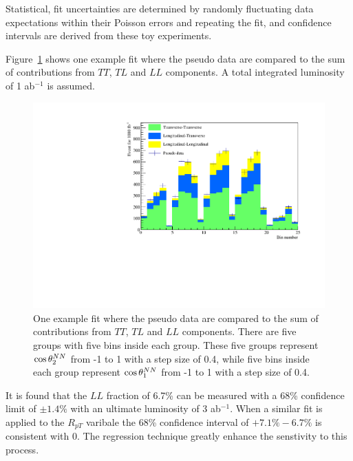 Statistical, fit uncertainties are determined by randomly
fluctuating data expectations within their Poisson errors and
repeating the fit, and confidence intervals are derived from these toy experiments.  


Figure~\ref{fig:fit_example} shows one example fit where the pseudo data are compared to the sum of 
contributions from $TT$, $TL$ and $LL$ components. A total integrated luminosity of 1 ab$^{-1}$ is assumed.  

\begin{figure}[h]
\includegraphics[width=.49\textwidth]{./fig/NN_fit_3.pdf}
\caption{\label{fig:fit_example} One example fit where the pseudo data are compared to the sum of 
contributions from $TT$, $TL$ and $LL$ components. There are five groups with five bins inside each group. 
These five groups represent $ \cos \theta^{NN}  _2$ from -1 to 1 with a step size of 0.4, while five bins inside each group represent $ \cos \theta^{NN}  _1$ from -1 to 1 with a step size of 0.4.}
\end{figure}

It is found that the $LL$ fraction of 6.7\% can be measured with a 68\% confidence limit of $\pm1.4\%$ with an ultimate luminosity of 3 ab$^{-1}$. When a similar fit is applied to the $R_{pT}$ varibale the 68\% confidence interval of $+7.1\% - 6.7\%$ is consistent with 0. The regression technique greatly enhance the senstivity to this process.

